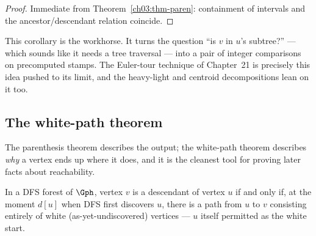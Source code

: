 \begin{proof}
Immediate from Theorem~\ref{ch03:thm-paren}: containment of intervals and the ancestor/descendant relation coincide.
\end{proof}

This corollary is the workhorse. It turns the question ``is $v$ in $u$'s subtree?'' --- which sounds like it needs a tree traversal --- into a pair of integer comparisons on precomputed stamps. The Euler-tour technique of Chapter~21 is precisely this idea pushed to its limit, and the heavy-light and centroid decompositions lean on it too.

\subsection{The white-path theorem}

The parenthesis theorem describes the output; the white-path theorem describes \emph{why} a vertex ends up where it does, and it is the cleanest tool for proving later facts about reachability.

\begin{theorem}\label{ch03:thm-whitepath}
In a DFS forest of $\Gph$, vertex $v$ is a descendant of vertex $u$ if and only if, at the moment $d[u]$ when DFS first discovers $u$, there is a path from $u$ to $v$ consisting entirely of white (as-yet-undiscovered) vertices --- $u$ itself permitted as the white start.
\end{theorem}

